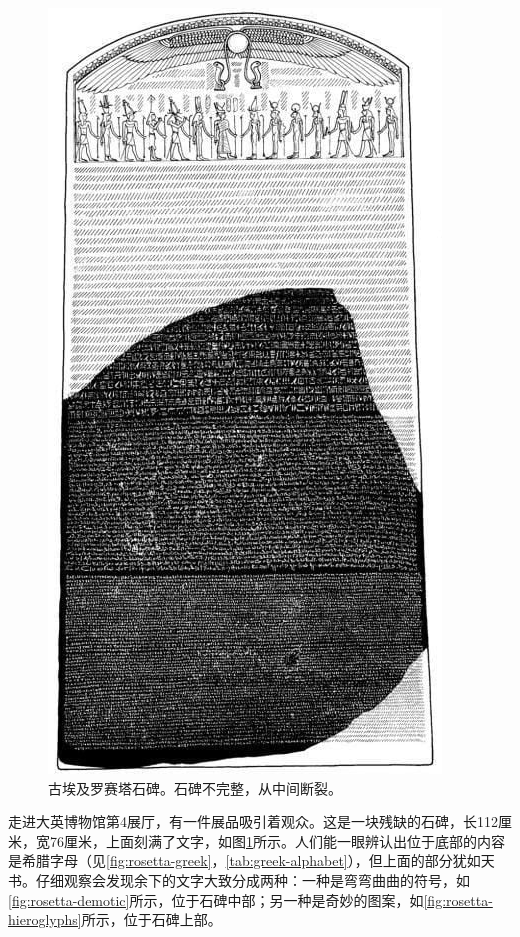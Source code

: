 \documentclass[b5paper]{ctexart}
\begin{document}
\begin{figure}[htbp]
 \centering
 \includegraphics[scale=0.5]{img/Rosetta-stone-recons}
 \caption{古埃及罗赛塔石碑。石碑不完整，从中间断裂。}
 \label{fig:rosetta-stone-recons}
\end{figure}

走进大英博物馆第4展厅，有一件展品吸引着观众。这是一块残缺的石碑，长112厘米，宽76厘米，上面刻满了文字，如图\ref{fig:rosetta-stone-recons}所示。人们能一眼辨认出位于底部的内容是希腊字母（见\cref{fig:rosetta-greek}，\cref{tab:greek-alphabet}），但上面的部分犹如天书。仔细观察会发现余下的文字大致分成两种：一种是弯弯曲曲的符号，如\cref{fig:rosetta-demotic}所示，位于石碑中部；另一种是奇妙的图案，如\cref{fig:rosetta-hieroglyphs}所示，位于石碑上部。
\end{document}
